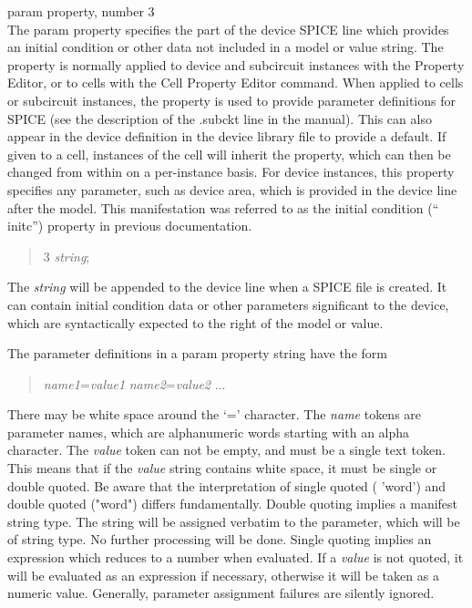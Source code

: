 \begin{description}
\item{\et param} property, number 3\\
The {\et param} property specifies the part of the device SPICE line
which provides an initial condition or other data not included in a
model or value string.  The property is normally applied to device and
subcircuit instances with the {\cb Property Editor}, or to cells with
the {\cb Cell Property Editor} command.  When applied to cells or
subcircuit instances, the property is used to provide parameter
definitions for SPICE (see the description of the {\vt .subckt} line
in the {\WRspice} manual).  This can also appear in the device
definition in the device library file to provide a default.  If given
to a cell, instances of the cell will inherit the property, which can
then be changed from within {\Xic} on a per-instance basis.  For
device instances, this property specifies any parameter, such as
device area, which is provided in the device line after the model. 
This manifestation was referred to as the initial condition (``{\et
initc}'') property in previous documentation.
\begin{quote} 3 {\it string\/};
\end{quote}
The {\it string\/} will be appended to the device line when a SPICE file
is created.  It can contain initial condition data or other parameters
significant to the device, which are syntactically expected to the
right of the model or value.

The parameter definitions in a {\et param} property string have the
form
\begin{quote}
{\it name1\/}{\vt =}{\it value1} {\it name2\/}{\vt =}{\it value2} ...
\end{quote}

There may be white space around the `{\vt =}' character.  The {\it
name} tokens are parameter names, which are alphanumeric words
starting with an alpha character.  The {\it value} token can not be
empty, and must be a single text token.  This means that if the {\it
value} string contains white space, it must be single or double
quoted.  Be aware that the interpretation of single quoted ({\vt
'word'}) and double quoted ({\vt "word"}) differs fundamentally. 
Double quoting implies a manifest string type.  The string will be
assigned verbatim to the parameter, which will be of string type.  No
further processing will be done.  Single quoting implies an expression
which reduces to a number when evaluated.  If a {\it value} is not
quoted, it will be evaluated as an expression if necessary, otherwise
it will be taken as a numeric value.  Generally, parameter assignment
failures are silently ignored.


\end{description}
